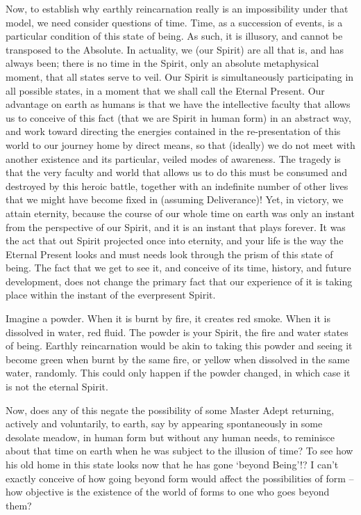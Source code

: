 \begin{footnotesize}
\begin{sffamily}
Now, to establish why earthly reincarnation really is an impossibility under that model, we need consider questions of time. Time, as a succession of events, is a particular condition of this state of being. As such, it is illusory, and cannot be transposed to the Absolute. In actuality, we (our Spirit) are all that is, and has always been; there is no time in the Spirit, only an absolute metaphysical moment, that all states serve to veil. Our Spirit is simultaneously participating in all possible states, in a moment that we shall call the Eternal Present. Our advantage on earth as humans is that we have the intellective faculty that allows us to conceive of this fact (that we are Spirit in human form) in an abstract way, and work toward directing the energies contained in the re-presentation of this world to our journey home by direct means, so that (ideally) we do not meet with another existence and its particular, veiled modes of awareness. The tragedy is that the very faculty and world that allows us to do this must be consumed and destroyed by this heroic battle, together with an indefinite number of other lives that we might have become fixed in (assuming Deliverance)! Yet, in victory, we attain eternity, because the course of our whole time on earth was only an instant from the perspective of our Spirit, and it is an instant that plays forever. It was the act that out Spirit projected once into eternity, and your life is the way the Eternal Present looks and must needs look through the prism of this state of being. The fact that we get to see it, and conceive of its time, history, and future development, does not change the primary fact that our experience of it is taking place within the instant of the everpresent Spirit.

Imagine a powder. When it is burnt by fire, it creates red smoke. When it is dissolved in water, red fluid. The powder is your Spirit, the fire and water states of being. Earthly reincarnation would be akin to taking this powder and seeing it become green when burnt by the same fire, or yellow when dissolved in the same water, randomly. This could only happen if the powder changed, in which case it is not the eternal Spirit.

Now, does any of this negate the possibility of some Master Adept returning, actively and voluntarily, to earth, say by appearing spontaneously in some desolate meadow, in human form but without any human needs, to reminisce about that time on earth when he was subject to the illusion of time? To see how his old home in this state looks now that he has gone `beyond Being'!? I can't exactly conceive of how going beyond form would affect the possibilities of form -- how objective is the existence of the world of forms to one who goes beyond them?


\end{sffamily}
\end{footnotesize}
